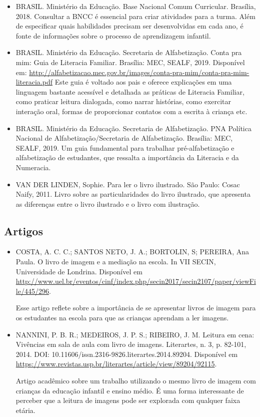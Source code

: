 \documentclass[11pt]{extarticle}
\begin{document}
\begin{itemize}
\item BRASIL. Ministério da Educação. Base Nacional Comum Curricular. Brasília, 2018.
Consultar a BNCC é essencial para criar atividades para a turma. Além de especificar 
quais habilidades precisam ser desenvolvidas em cada ano, é fonte de informações sobre 
o processo de aprendizagem infantil. 

\item BRASIL. Ministério da Educação. Secretaria de Alfabetização. Conta pra mim: Guia de Literacia Familiar. 
Brasília: MEC, SEALF, 2019. Disponível em: \url{http://alfabetizacao.mec.gov.br/images/conta-pra-mim/conta-pra-mim-literacia.pdf}
Este guia é voltado aos pais e oferece explicações em uma linguagem bastante acessível e detalhada as práticas de Literacia Familiar, 
como praticar leitura dialogada, como narrar histórias, como exercitar interação oral, formas de proporcionar contatos com a escrita à criança etc. 
 
\item BRASIL. Ministério da Educação. Secretaria de Alfabetização. PNA Política Nacional de Alfabetização/Secretaria 
de Alfabetização. Brasília: MEC, SEALF, 2019.
Um guia fundamental para trabalhar pré-alfabetização e alfabetização de estudantes, que ressalta a importância da Literacia e da Numeracia. 

\item VAN DER LINDEN, Sophie. Para ler o livro ilustrado. São Paulo: Cosac Naify, 2011.
Livro sobre as particularidades do livro ilustrado, que apresenta as diferenças entre o livro ilustrado e o livro com ilustração. 
\end{itemize}

\subsection{Artigos}

\begin{itemize}
\item COSTA, A. C. C.; SANTOS NETO, J. A.; BORTOLIN, S; PEREIRA, Ana Paula. O livro de imagem e a mediação na escola. 
In VII SECIN, Universidade de Londrina. Disponível em \url{http://www.uel.br/eventos/cinf/index.php/secin2017/secin2107/paper/viewFile/445/296}. 

Esse artigo reflete sobre a importância de se apresentar livros de imagem para os estudantes na escola para que as crianças aprendam a ler imagens. 

\item NANNINI, P. B. R.; MEDEIROS, J. P. S.; RIBEIRO, J. M. Leitura em cena: Vivências em sala de aula com livro de imagens. 
Literartes, n. 3, p. 82-101, 2014. DOI: 10.11606/issn.2316-9826.literartes.2014.89204. 
Disponível em \url{https://www.revistas.usp.br/literartes/article/view/89204/92115}.

Artigo acadêmico sobre um trabalho utilizando o mesmo livro de imagem com crianças da educação infantil e ensino médio. 
É uma forma interessante de perceber que a leitura de imagens pode ser explorada com qualquer faixa etária. 
\end{itemize}

% 
\end{document}
